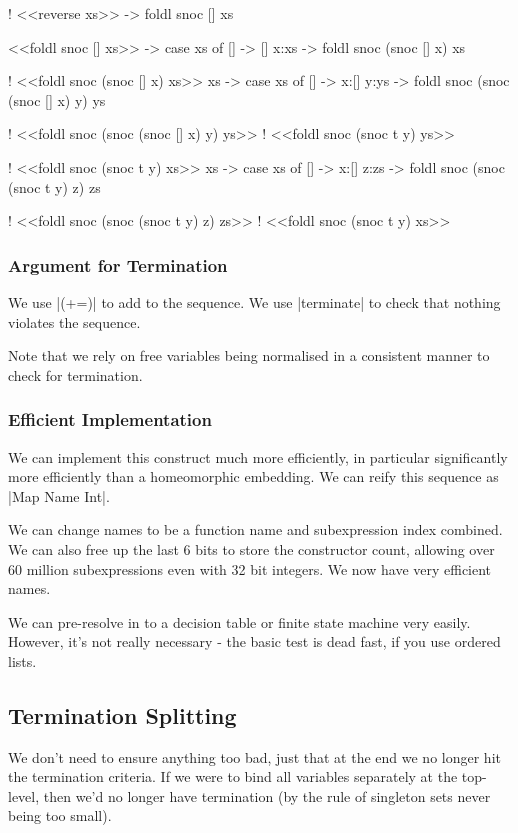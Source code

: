 \documentclass{sigplanconf}
\begin{document}
\begin{code}
! <<reverse xs>>
\xs -> foldl snoc [] xs

<<foldl snoc [] xs>>
\xs -> case xs of
    [] -> []
    x:xs -> foldl snoc (snoc [] x) xs

! <<foldl snoc (snoc [] x) xs>>
\x xs -> case xs of
    [] -> x:[]
    y:ys -> foldl snoc (snoc (snoc [] x) y) ys

! <<foldl snoc (snoc (snoc [] x) y) ys>>
! <<foldl snoc (snoc t y) ys>>

! <<foldl snoc (snoc t y) xs>>
\x xs -> case xs of
    [] -> x:[]
    z:zs -> foldl snoc (snoc (snoc t y) z) zs

! <<foldl snoc (snoc (snoc t y) z) zs>>
! <<foldl snoc (snoc t y) xs>>
\end{code}


\subsubsection{Argument for Termination}

We use |(+=)| to add to the sequence. We use |terminate| to check that nothing violates the sequence.

Note that we rely on free variables being normalised in a consistent manner to check for termination.

\subsubsection{Efficient Implementation}

We can implement this construct much more efficiently, in particular significantly more efficiently than a homeomorphic embedding. We can reify this sequence as |Map Name Int|.

We can change names to be a function name and subexpression index combined. We can also free up the last 6 bits to store the constructor count, allowing over 60 million subexpressions even with 32 bit integers. We now have very efficient names.

We can pre-resolve in to a decision table or finite state machine very easily. However, it's not really necessary - the basic test is dead fast, if you use ordered lists.

\subsection{Termination Splitting}
\label{sec:term_split}

We don't need to ensure anything too bad, just that at the end we no longer hit the termination criteria. If we were to bind all variables separately at the top-level, then we'd no longer have termination (by the rule of singleton sets never being too small).
\end{document}
